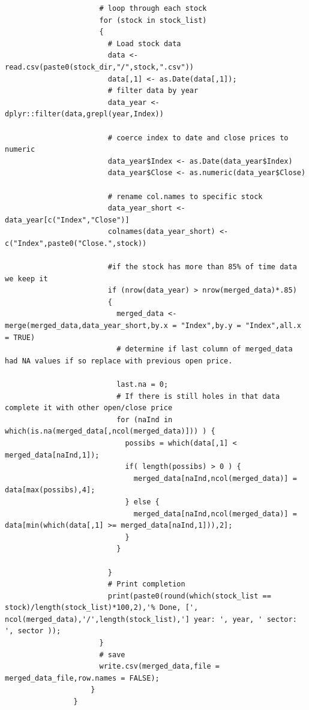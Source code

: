 \documentclass[12pt,titlepage,letter]{article}
\begin{document}
\begin{lstlisting}
				      # loop through each stock
				      for (stock in stock_list)
				      {
				        # Load stock data
				        data <- read.csv(paste0(stock_dir,"/",stock,".csv"))
				        data[,1] <- as.Date(data[,1]);
				        # filter data by year
				        data_year <- dplyr::filter(data,grepl(year,Index))
				        
				        # coerce index to date and close prices to numeric
				        data_year$Index <- as.Date(data_year$Index)
				        data_year$Close <- as.numeric(data_year$Close)
				        
				        # rename col.names to specific stock
				        data_year_short <- data_year[c("Index","Close")]
				        colnames(data_year_short) <- c("Index",paste0("Close.",stock))
				        
				        #if the stock has more than 85% of time data we keep it
				        if (nrow(data_year) > nrow(merged_data)*.85) 
				        {
				          merged_data <- merge(merged_data,data_year_short,by.x = "Index",by.y = "Index",all.x = TRUE)
				          # determine if last column of merged_data had NA values if so replace with previous open price. 
				          
				          last.na = 0;
				          # If there is still holes in that data complete it with other open/close price
				          for (naInd in which(is.na(merged_data[,ncol(merged_data)])) ) {
				            possibs = which(data[,1] < merged_data[naInd,1]);
				            if( length(possibs) > 0 ) {
				              merged_data[naInd,ncol(merged_data)] = data[max(possibs),4];
				            } else {
				              merged_data[naInd,ncol(merged_data)] = data[min(which(data[,1] >= merged_data[naInd,1])),2];
				            }
				          }
				          
				        }
				        # Print completion
				        print(paste0(round(which(stock_list == stock)/length(stock_list)*100,2),'% Done, [', ncol(merged_data),'/',length(stock_list),'] year: ', year, ' sector: ', sector ));
				      }
				      # save
				      write.csv(merged_data,file = merged_data_file,row.names = FALSE);
				    }
				}
			\end{lstlisting}
\end{document}
